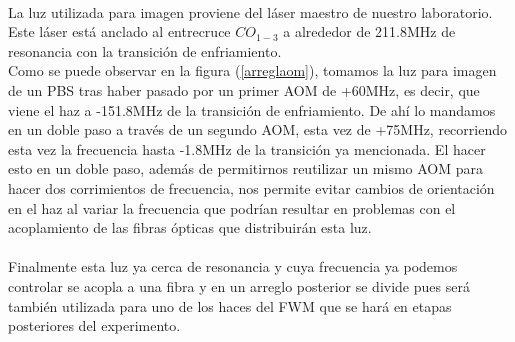 \documentclass[12pt,twoside]{article}
\begin{document}
\\
La luz utilizada para imagen proviene del láser maestro de nuestro laboratorio. Este láser está anclado al entrecruce $CO_{1-3}$ a alrededor de 211.8MHz de resonancia con la transición de enfriamiento. \\
Como se puede observar en la figura (\ref{arreglaom}), tomamos la luz para imagen de un PBS tras haber pasado por un primer AOM de +60MHz, es decir, que viene el haz a -151.8MHz de la transición de enfriamiento. De ahí lo mandamos en un doble paso a través de un segundo AOM, esta vez de +75MHz, recorriendo esta vez la frecuencia hasta -1.8MHz de la transición ya mencionada. El hacer esto en un doble paso, además de permitirnos reutilizar un mismo AOM para hacer dos corrimientos de frecuencia, nos permite evitar cambios de orientación en el haz al variar la frecuencia que podrían resultar en problemas con el acoplamiento de las fibras ópticas que distribuirán esta luz. \cite{doublepass}\\
\\
Finalmente esta luz ya cerca de resonancia y cuya frecuencia ya podemos controlar se acopla a una fibra y en un arreglo posterior se divide pues será también utilizada para uno de los haces del FWM que se hará en etapas posteriores del experimento. 
\end{document}
